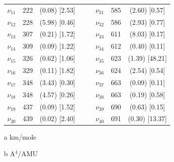 \begin{table}[H]
\begin{center}
\begin{threeparttable}
\begin{tabular}{c c c c c c c c}
$\nu_{11}$&  222 & (0.08)  [2.53] &  &  & $\nu_{31}$ & 585 & (2.60)  [0.57] \\ 
$\nu_{12}$&  228 & (5.98)  [0.46] &  &  & $\nu_{32}$ & 586 & (2.93)  [0.77] \\ 
$\nu_{13}$&  307 & (0.21)  [1.72] &  &  & $\nu_{33}$ & 611 & (8.03)  [0.17] \\ 
$\nu_{14}$&  309 & (0.09)  [1.22] &  &  & $\nu_{34}$ & 612 & (0.40)  [0.11] \\ 
$\nu_{15}$&  326 & (0.62)  [1.06] &  &  & $\nu_{35}$ & 623 & (1.39)  [48.21] \\ 
$\nu_{16}$&  329 & (0.11)  [1.82] &  &  & $\nu_{36}$ & 624 & (2.54)  [0.54] \\ 
$\nu_{17}$&  348 & (3.43)  [0.30] &  &  & $\nu_{37}$ & 663 & (0.09)  [0.11] \\ 
$\nu_{18}$&  348 & (4.57)  [0.26] &  &  & $\nu_{38}$ & 663 & (0.19)  [0.58] \\ 
$\nu_{19}$&  437 & (0.09) [1.52] &  &  & $\nu_{39}$ & 690 & (0.63)  [0.15] \\ 
$\nu_{20}$&  439 & (0.02)  [2.40] &  &  & $\nu_{40}$ & 691 & (0.30)  [13.37] \\ 
	\bottomrule
\end{tabular}

\begin{tablenotes}
	\item[a] km/mole
	\item[b] A$^{4}$/AMU
\end{tablenotes}
\end{threeparttable}
\end{center}
\label{low-freqTribenzofDi}
\end{table}



